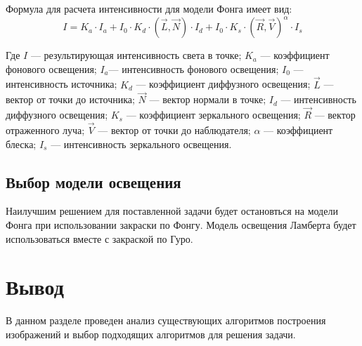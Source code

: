 Формула для расчета интенсивности для модели Фонга имеет вид:
\begin{equation}
    I = K_a \cdot I_a + I_0 \cdot K_d \cdot (\vec{L}, \vec{N}) \cdot I_d + I_0 \cdot K_s \cdot (\vec{R}, \vec{V})^\alpha \cdot I_s
\end{equation}

Где $I$ — результирующая интенсивность света в точке; 
$K_a$ — коэффициент фонового освещения; 
$I_a$— интенсивность фонового освещения; 
$I_0$ — интенсивность источника; 
$K_d$ — коэффициент диффузного освещения; 
$\vec{L}$ — вектор от точки до источника; 
$\vec{N}$ — вектор нормали в точке; 
$I_d$ — интенсивность диффузного освещения; 
$K_s$ — коэффициент зеркального освещения; 
$\vec{R}$ — вектор отраженного луча; 
$\vec{V}$ — вектор от точки до наблюдателя; 
$\alpha$ — коэффициент блеска; 
$I_s$ — интенсивность зеркального освещения.


\subsection{Выбор модели освещения}
Наилучшим решением для поставленной задачи будет остановться на модели Фонга при использовании закраски по Фонгу.
Модель освещения Ламберта будет использоваться вместе с закраской по Гуро. 

\section*{Вывод}
В данном разделе проведен анализ существующих алгоритмов построения изображений и выбор подходящих алгоритмов для решения задачи.
